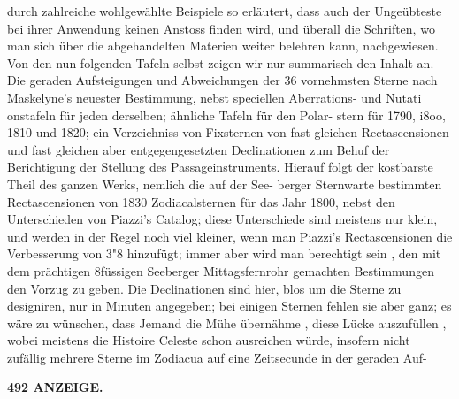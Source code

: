 \documentclass[12pt,a4paper]{article}
\begin{document}
durch  zahlreiche wohlgewählte  Beispiele  so  erläutert,  dass  auch  der  Ungeübteste  bei  ihrer  Anwendung  keinen  Anstoss finden  wird,  und  überall  die  Schriften,  wo  man  sich  über  die  abgehandelten  Materien  weiter  belehren kann,  nachgewiesen. Von  den  nun  folgenden  Tafeln  selbst  zeigen  wir  nur  summarisch  den  Inhalt  an.  Die  geraden Aufsteigungen  und  Abweichungen  der  36  vornehmsten  Sterne  nach  Maskelyne's  neuester  Bestimmung, nebst  speciellen  Aberrations-  und  Nutati onstafeln  für  jeden  derselben;  ähnliche  Tafeln  für  den  Polar- stern für  1790,  i8oo,  1810  und  1820;  ein  Verzeichniss  von  Fixsternen  von  fast  gleichen  Rectascensionen und  fast  gleichen  aber  entgegengesetzten  Declinationen  zum  Behuf  der  Berichtigung  der  Stellung  des Passageinstruments.  Hierauf  folgt  der  kostbarste  Theil  des  ganzen  Werks,  nemlich  die  auf  der  See- berger  Sternwarte  bestimmten  Rectascensionen  von  1830  Zodiacalsternen  für  das  Jahr  1800,  nebst  den Unterschieden  von  Piazzi's  Catalog;  diese  Unterschiede  sind  meistens  nur  klein,  und  werden  in  der Regel  noch  viel  kleiner,  wenn  man  Piazzi's  Rectascensionen  die  Verbesserung  von  3"8  hinzufügt;  immer aber  wird  man  berechtigt  sein ,  den  mit  dem  prächtigen  8füssigen  Seeberger  Mittagsfernrohr  gemachten Bestimmungen  den  Vorzug  zu  geben.  Die  Declinationen  sind  hier,  blos  um  die  Sterne  zu  designiren,  nur in  Minuten  angegeben;  bei  einigen  Sternen  fehlen  sie  aber  ganz;  es  wäre  zu  wünschen,  dass  Jemand die  Mühe  übernähme ,  diese  Lücke  auszufüllen ,  wobei  meistens  die  Histoire  Celeste  schon  ausreichen würde,   insofern  nicht  zufällig  mehrere  Sterne    im  Zodiacua   auf  eine   Zeitsecunde  in  der  geraden  Auf-

\vspace{0.5em}


\noindent\textbf{492  ANZEIGE.}
\end{document}
